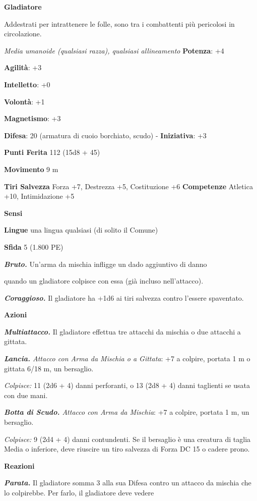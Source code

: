 \begin{multicols}{2}
\textbf{Gladiatore}

Addestrati per intrattenere le folle, sono tra i combattenti più
pericolosi in circolazione.

\emph{Media umanoide (qualsiasi razza), qualsiasi allineamento}
\textbf{Potenza}: +4

\textbf{Agilità}: +3

\textbf{Intelletto}: +0

\textbf{Volontà}: +1

\textbf{Magnetismo}: +3

\textbf{Difesa}: 20 (armatura di cuoio borchiato, scudo) - \textbf{Iniziativa}: +3

\textbf{Punti Ferita} 112 (15d8 + 45)

\textbf{Movimento} 9 m

\textbf{Tiri Salvezza} Forza +7, Destrezza +5, Costituzione +6
\textbf{Competenze} Atletica +10, Intimidazione +5

\textbf{Sensi} 

\textbf{Lingue} una lingua qualsiasi (di solito il Comune)

\textbf{Sfida} 5 (1.800 PE)\smallskip

\emph{\textbf{Bruto.}} Un'arma da mischia infligge un dado aggiuntivo di
danno

quando un gladiatore colpisce con essa (già incluso nell'attacco).

\emph{\textbf{Coraggioso.}} Il gladiatore ha +1d6 ai tiri salvezza
contro l'essere spaventato.

\smallskip\textbf{Azioni}

\emph{\textbf{Multiattacco.}} Il gladiatore effettua tre attacchi da
mischia o due attacchi a gittata.

\emph{\textbf{Lancia.} Attacco con Arma da Mischia o a Gittata}: +7 a
colpire, portata 1 m o gittata 6/18 m, un bersaglio.

\emph{Colpisce:} 11 (2d6 + 4) danni perforanti, o 13 (2d8 + 4) danni
taglienti se usata con due mani.

\emph{\textbf{Botta di Scudo.} Attacco con Arma da Mischia}: +7 a
colpire, portata 1 m, un bersaglio.

\emph{Colpisce:} 9 (2d4 + 4) danni contundenti. Se il bersaglio è una
creatura di taglia Media o inferiore, deve riuscire un tiro salvezza di Forza DC 15 o cadere prono.

\textbf{Reazioni}

\emph{\textbf{Parata.}} Il gladiatore somma 3 alla sua Difesa contro un
attacco da mischia che lo colpirebbe. Per farlo, il gladiatore deve
vedere


\end{multicols}

